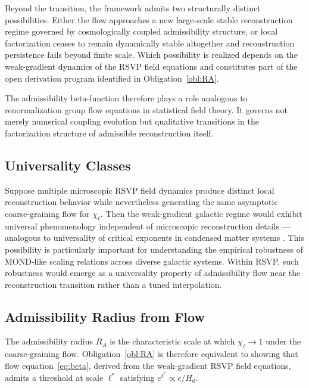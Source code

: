 \documentclass[11pt, a4paper]{article}
\theoremstyle{plain}
\theoremstyle{definition}
\theoremstyle{remark}
\newcommand{\RA}{R_{\!A}}
\begin{document}
Beyond the transition, the framework admits two structurally distinct possibilities.
Either the flow approaches a new large-scale stable reconstruction regime governed
by cosmologically coupled admissibility structure, or local factorization ceases to
remain dynamically stable altogether and reconstruction persistence fails beyond
finite scale.  Which possibility is realized depends on the weak-gradient dynamics
of the RSVP field equations and constitutes part of the open derivation program
identified in Obligation~\ref{obl:RA}.

The admissibility beta-function therefore plays a role analogous to renormalization
group flow equations in statistical field theory.  It governs not merely numerical
coupling evolution but qualitative transitions in the factorization structure of
admissible reconstruction itself.

\subsection{Universality Classes}

Suppose multiple microscopic RSVP field dynamics produce distinct local
reconstruction behavior while nevertheless generating the same asymptotic
coarse-graining flow for $\chi_\ell$. Then the weak-gradient galactic regime would
exhibit universal phenomenology independent of microscopic reconstruction details ---
analogous to universality of critical exponents in condensed matter systems
\cite{goldenfeld1992}. This possibility is particularly important for understanding
the empirical robustness of MOND-like scaling relations \cite{mcgaugh2011,famaey2012}
across diverse galactic systems. Within RSVP, such robustness would emerge as a
universality property of admissibility flow near the reconstruction transition rather
than a tuned interpolation.

\subsection{Admissibility Radius from Flow}

The admissibility radius $\RA$ is the characteristic scale at which $\chi_\ell \to
1$ under the coarse-graining flow. Obligation~\ref{obl:RA} is therefore equivalent
to showing that flow equation~\eqref{eq:beta}, derived from the weak-gradient RSVP
field equations, admits a threshold at scale $\ell^*$ satisfying $e^{\ell^*} \propto
c/H_0$.

\end{document}
